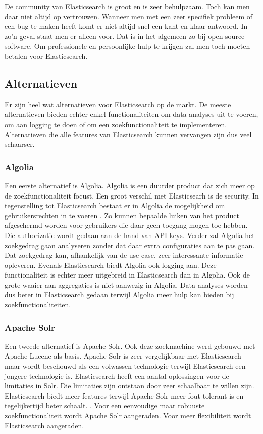De community van Elasticsearch is groot en is zeer behulpzaam. Toch kan men daar niet altijd op vertrouwen. Wanneer men met een zeer specifiek probleem of een bug te maken heeft komt er niet altijd snel een kant en klaar antwoord. In zo'n geval staat men er alleen voor. Dat is in het algemeen zo bij open source software. Om professionele en persoonlijke hulp te krijgen zal men toch moeten betalen voor Elasticsearch.

\subsection{Alternatieven}

Er zijn heel wat alternatieven voor Elasticsearch op de markt. De meeste alternatieven bieden echter enkel functionaliteiten om data-analyses uit te voeren, om aan logging te doen of om een zoekfunctionaliteit te implementeren. Alternatieven die alle features van Elasticsearch kunnen vervangen zijn dus veel schaarser. 

\subsubsection{Algolia}

Een eerste alternatief is Algolia. Algolia is een duurder product dat zich meer op de zoekfunctionaliteit focust. Een groot verschil met Elasticsearh is de security. In tegenstelling tot Elasticsearch bestaat er in Algolia de mogelijkheid om gebruikersrechten in te voeren \autocite{Algolia}. Zo kunnen bepaalde luiken van het product afgeschermd worden voor gebruikers die daar geen toegang mogen toe hebben. Die authorizatie wordt gedaan aan de hand van API keys. Verder zal Algolia het zoekgedrag gaan analyseren zonder dat daar extra configuraties aan te pas gaan. Dat zoekgedrag kan, afhankelijk van de use case, zeer interessante informatie opleveren. Evenals Elasticsearch biedt Algolia ook logging aan. Deze functionaliteit is echter meer uitgebreid in Elasticsearch dan in Algolia. Ook de grote waaier aan aggregaties is niet aanwezig in Algolia. Data-analyses worden dus beter in Elasticsearch gedaan terwijl Algolia meer hulp kan bieden bij zoekfunctionaliteiten.

\subsubsection{Apache Solr}

Een tweede alternatief is Apache Solr. Ook deze zoekmachine werd gebouwd met Apache Lucene als basis. Apache Solr is zeer vergelijkbaar met Elasticsearch maar wordt beschouwd als een volwassen technologie terwijl Elasticsearch een jongere technologie is. Elasticsearch heeft een aantal oplossingen voor de limitaties in Solr. Die limitaties zijn ontstaan door zeer schaalbaar te willen zijn. Elasticsearch biedt meer features terwijl Apache Solr meer fout tolerant is en tegelijkertijd beter schaalt. \autocite{Solr}. Voor een eenvoudige maar robuuste zoekfunctionaliteit wordt Apache Solr aangeraden. Voor meer flexibiliteit wordt Elasticsearch aangeraden.

